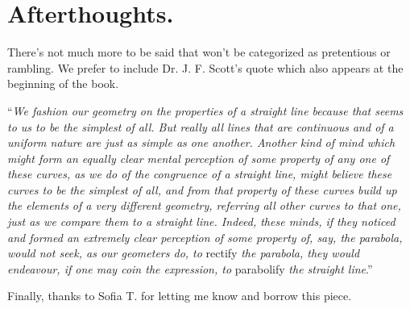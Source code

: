\section{Afterthoughts.}

There's not much more to be said that won't be categorized as pretentious or rambling. We prefer to include Dr. J. F. Scott's quote which also appears at the beginning of the book.

\enquote{\textit{We fashion our geometry on the properties of a straight line because that seems to us to be the simplest of all. But really all lines that are continuous and of a uniform nature are just as simple as one another. Another kind of mind which might form an equally clear mental perception of some property of any one of these curves, as we do of the congruence of a straight line, might believe these curves to be the simplest of all, and from that property of these curves build up the elements of a very different geometry, referring all other curves to that one, just as we compare them to a straight line. Indeed, these minds, if they noticed and formed an extremely clear perception of some property of, say, the parabola, would not seek, as our geometers do, to} rectify \textit{the parabola, they would endeavour, if one may coin the expression, to} parabolify \textit{the straight line}.}

Finally, thanks to Sofia T. for letting me know and borrow this piece.

